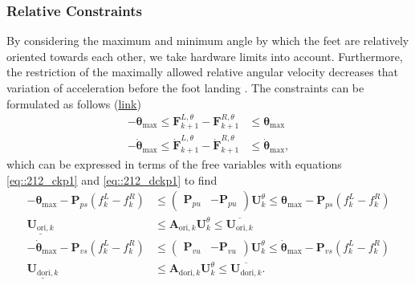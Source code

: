 \subsubsection{Relative Constraints}
By considering the maximum and minimum angle by which the feet are relatively oriented towards each other, we take hardware limits into account. Furthermore, the restriction of the maximally allowed relative angular velocity decreases that variation of acceleration before the foot landing \cite{naveau2016reactive}. The constraints can be formulated as follows (\href{https://github.com/mhubii/nmpc_pattern_generator/blob/dc1f5a9366cbbbf76f1b02cada642f6ac9a04c89/libs/pattern_generator/src/base_generator.cpp#L1244}{\underline{link}})
\begin{align}
	-\bm{\theta}_\text{max}\leq\bm{F}_{k+1}^{L,\theta} - \bm{F}_{k+1}^{R,\theta} &\leq \bm{\theta}_\text{max} \\
	-\dot{\bm{\theta}}_\text{max}\leq\dot{\bm{F}}_{k+1}^{L,\theta} - \dot{\bm{F}}_{k+1}^{R,\theta} &\leq \dot{\bm{\theta}}_\text{max},
\end{align}
which can be expressed in terms of the free variables with equations \ref{eq::212_ckp1} and \ref{eq::212_dckp1} to find
\begin{align}
	-\bm{\theta}_\text{max}-\bm{P}_{ps}(f_k^L-f_k^R)&\leq \begin{pmatrix}
	\bm{P}_{pu} & -\bm{P}_{pu}
	\end{pmatrix}\bm{U}_k^\theta \leq \bm{\theta}_\text{max}-\bm{P}_{ps}(f_k^L-f_k^R) \\
	\underline{\bm{U}_{\text{ori},k}}&\leq \bm{A}_{\text{ori},k}\bm{U}_k^\theta \leq \overline{\bm{U}_{\text{ori},k}}\\
		-\dot{\bm{\theta}}_\text{max}-\bm{P}_{vs}(f_k^L-f_k^R)&\leq \begin{pmatrix}
	\bm{P}_{vu} & -\bm{P}_{vu}
	\end{pmatrix}\bm{U}_k^\theta \leq \dot{\bm{\theta}}_\text{max}-\bm{P}_{vs}(f_k^L-f_k^R)\\
	\underline{\bm{U}_{\text{dori},k}}&\leq \bm{A}_{\text{dori},k}\bm{U}_k^\theta \leq \overline{\bm{U}_{\text{dori},k}}.
\end{align}
